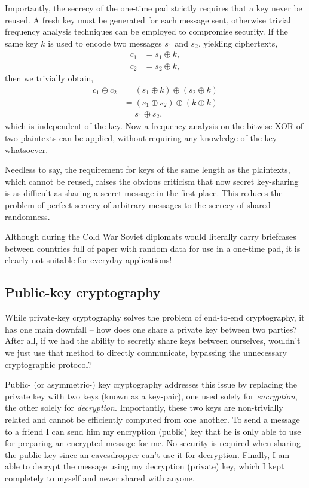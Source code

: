 Importantly, the secrecy of the one-time pad strictly requires that a key never be reused. A fresh key must be generated for each message sent, otherwise trivial frequency analysis techniques can be employed to compromise security. If the same key $k$ is used to encode two messages $s_1$ and $s_2$, yielding ciphertexts,
\begin{align}
c_1&=s_1\oplus k,\nonumber\\
c_2&=s_2\oplus k,
\end{align}
then we trivially obtain,
\begin{align}
c_1 \oplus c_2 &= (s_1 \oplus k) \oplus (s_2 \oplus k) \nonumber \\
&= (s_1 \oplus s_2) \oplus (k \oplus k) \nonumber \\
&= s_1 \oplus s_2,
\end{align}
which is independent of the key. Now a frequency analysis on the bitwise XOR of two plaintexts can be applied, without requiring any knowledge of the key whatsoever.

Needless to say, the requirement for keys of the same length as the plaintexts, which cannot be reused, raises the obvious criticism that now secret key-sharing is as difficult as sharing a secret message in the first place. This reduces the problem of perfect secrecy of arbitrary messages to the secrecy of shared randomness. 

Although during the Cold War Soviet diplomats would literally carry briefcases between countries full of paper with random data for use in a one-time pad, it is clearly not suitable for everyday applications!

%
%

\subsection{Public-key cryptography}

While private-key cryptography solves the problem of end-to-end cryptography, it has one main downfall -- how does one share a private key between two parties? After all, if we had the ability to secretly share keys between ourselves, wouldn't we just use that method to directly communicate, bypassing the unnecessary cryptographic protocol?

Public- (or asymmetric-) key cryptography addresses this issue by replacing the private key with two keys (known as a key-pair), one used solely for \textit{encryption}, the other solely for \textit{decryption}. Importantly, these two keys are non-trivially related and cannot be efficiently computed from one another. To send a message to a friend I can send him my encryption (public) key that he is only able to use for preparing an encrypted message for me. No security is required when sharing the public key since an eavesdropper can't use it for decryption. Finally, I am able to decrypt the message using my decryption (private) key, which I kept completely to myself and never shared with anyone.

